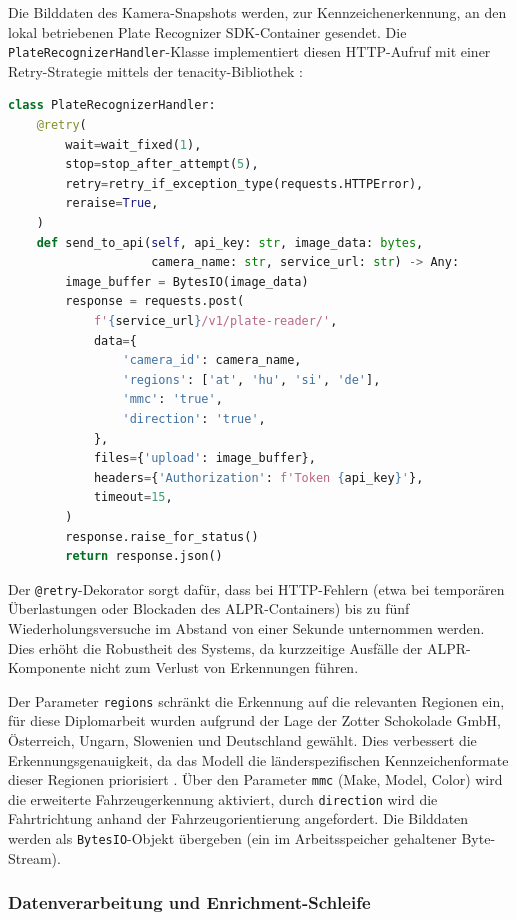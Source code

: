 Die Bilddaten des Kamera-Snapshots werden, zur Kennzeichenerkennung, an den lokal betriebenen Plate Recognizer SDK-Container gesendet.
Die \texttt{PlateRecognizerHandler}-Klasse implementiert diesen HTTP-Aufruf mit einer Retry-Strategie mittels der tenacity-Bibliothek \cite{tenacity}:

\begin{lstlisting}[language=Python, caption={Plate Recognizer Integration mit Retry-Strategie}, label={lst:plate_recognizer}]
class PlateRecognizerHandler:
    @retry(
        wait=wait_fixed(1),
        stop=stop_after_attempt(5),
        retry=retry_if_exception_type(requests.HTTPError),
        reraise=True,
    )
    def send_to_api(self, api_key: str, image_data: bytes, 
                    camera_name: str, service_url: str) -> Any:
        image_buffer = BytesIO(image_data)
        response = requests.post(
            f'{service_url}/v1/plate-reader/',
            data={
                'camera_id': camera_name,
                'regions': ['at', 'hu', 'si', 'de'],
                'mmc': 'true',
                'direction': 'true',
            },
            files={'upload': image_buffer},
            headers={'Authorization': f'Token {api_key}'},
            timeout=15,
        )
        response.raise_for_status()
        return response.json()
\end{lstlisting}

Der \texttt{@retry}-Dekorator sorgt dafür, dass bei HTTP-Fehlern (etwa bei temporären Überlastungen oder Blockaden des ALPR-Containers) bis zu fünf Wiederholungsversuche im Abstand von einer Sekunde unternommen werden.
Dies erhöht die Robustheit des Systems, da kurzzeitige Ausfälle der ALPR-Komponente nicht zum Verlust von Erkennungen führen.

Der Parameter \texttt{regions} schränkt die Erkennung auf die relevanten Regionen ein, für diese Diplomarbeit wurden aufgrund der Lage der Zotter Schokolade GmbH, Österreich, Ungarn, Slowenien und Deutschland gewählt.
Dies verbessert die Erkennungsgenauigkeit, da das Modell die länderspezifischen Kennzeichenformate dieser Regionen priorisiert \cite{platerecognizer_api}.
Über den Parameter \texttt{mmc} (Make, Model, Color) wird die erweiterte Fahrzeugerkennung aktiviert, durch \texttt{direction} wird die Fahrtrichtung anhand der Fahrzeugorientierung angefordert.
Die Bilddaten werden als \texttt{BytesIO}-Objekt übergeben (ein im Arbeitsspeicher gehaltener Byte-Stream).


\subsubsection{Datenverarbeitung und Enrichment-Schleife}

